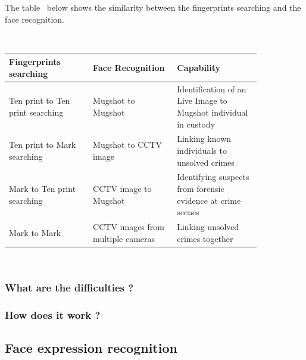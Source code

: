 The table~\cite{NPIA} below shows the similarity between the fingerprints searching and the face recognition.

~\\
\begin{tabular}{|p{0.28\linewidth}|p{0.28\linewidth}|p{0.28\linewidth}|}
\hline
\textbf{Fingerprints searching}&\textbf{Face Recognition}&\textbf{Capability}\\
\hline
Ten print to Ten print searching&Mugshot to Mugshot&Identification of an Live Image to Mugshot individual in custody\\
\hline
Ten print to Mark searching&Mugshot to CCTV image&Linking known individuals to unsolved crimes\\
\hline
Mark to Ten print searching&CCTV image to Mugshot&Identifying suspects from forensic evidence at crime scenes\\
\hline
Mark to Mark&CCTV images from multiple cameras&Linking unsolved crimes together\\
\hline
\end{tabular}

~\\
\subsubsection{What are the difficulties ? }
\subsubsection{How does it work ? }

\subsection{Face expression recognition}

